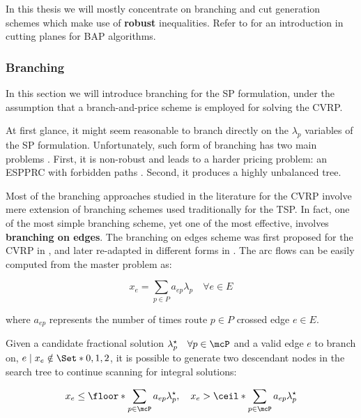 In this thesis
we will mostly concentrate on branching and cut generation schemes
which make use of \textbf{robust} inequalities.
Refer to \textcite{desaulniers2011} for an introduction in cutting planes for BAP algorithms.


\subsubsection{Branching}
\label{sec:bap-branching}

In this section we will introduce branching for the SP formulation,
under the assumption that a branch-and-price scheme is employed
for solving the CVRP.

At first glance,
it might seem reasonable to branch directly on the $\lambda_p$ variables of the SP formulation.
Unfortunately, such form of branching has two main problems \parencite{vanderbeck2010reformulation}.
First, it is non-robust and leads to a harder pricing problem: an ESPPRC with forbidden paths \parencite{villeneuve2005}.
Second, it produces a highly unbalanced tree.

Most of the branching approaches studied in the literature for the CVRP involve
mere extension of branching schemes used traditionally for the TSP.
In fact, one of the most simple branching scheme,
yet one of the most effective,
involves \textbf{branching on edges}.
The branching on edges scheme was first proposed for the CVRP in \textcite{christofides1969},
and later re-adapted in different forms in \textcite{fisher1994, miller1995}.
The arc flows can be easily computed from the master problem as:

\begin{equation}
	x_e = \sum_{p \in P} a_{ep} \lambda_p  \quad \forall e \in E
\end{equation}

where $a_{ep}$ represents the number of times route $p \in P$ crossed edge $e \in E$.

Given a candidate fractional solution $\lambda^\star_p \quad \forall p \in \mcP$
and a valid edge $e$ to branch on, $e \mid x_e \notin \Set*{0, 1, 2}$,
it is possible to generate two descendant nodes in the search tree
to continue scanning for integral solutions:

\begin{equation}\label{eq:sp-branching-on-arcs}
	x_e \le \floor*{\sum_{p \in \mcP} a_{ep} \lambda^\star_p}, \quad
	x_e > \ceil*{\sum_{p \in \mcP} a_{ep} \lambda^\star_p}
\end{equation}

